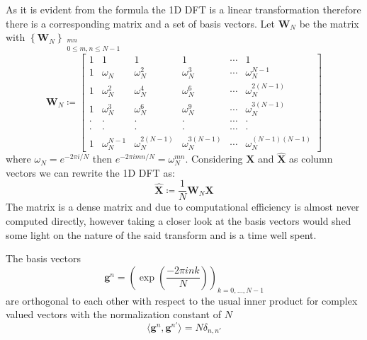 \begin{Rem}
As it is evident from the formula the 1D \ac{DFT} is a linear transformation therefore there is a corresponding matrix 
and a set of basis vectors. Let $\boldsymbol{W}_N$ be the matrix with $\left\{\boldsymbol{W}_N\right\}_{\substack{mn \\ 0 \leq m,n \leq N-1}}$ 
\begin{equation}
    \boldsymbol{W}_N \coloneqq 
    \begin{bmatrix}
        1     & 1                & 1                   & 1                   & \cdots & 1                      \\
        1     & \omega_{N}^{}    & \omega_{N}^{2}      & \omega_{N}^{3}      & \cdots & \omega_{N}^{N-1}       \\
        1     & \omega_{N}^{2}   & \omega_{N}^{4}      & \omega_{N}^{6}      & \cdots & \omega_{N}^{2(N-1)}    \\
        1     & \omega_{N}^{3}   & \omega_{N}^{6}      & \omega_{N}^{9}      & \cdots & \omega_{N}^{3(N-1)}    \\
        \cdot & \cdot            & \cdot               & \cdot               & \cdots & \cdot                  \\ 
        \cdot & \cdot            & \cdot               & \cdot               & \cdots & \cdot                  \\ 
        1     & \omega_{N}^{N-1} & \omega_{N}^{2(N-1)} & \omega_{N}^{3(N-1)} & \cdots & \omega_{N}^{(N-1)(N-1)}
        \end{bmatrix}
\end{equation}
where $\omega_N = e^{-2\pi i/N}$ then $e^{-2\pi imn/N} = \omega_N^{mn}$. Considering $\boldsymbol{X}$ 
and $\hat {\boldsymbol{X}}$ as column vectors we can rewrite the 1D \ac{DFT} as:
\begin{equation}
    \hat {\boldsymbol{X}} \coloneqq \frac{1}{N}\boldsymbol{W}_N\boldsymbol{X}
\end{equation}
 The matrix is a dense matrix\cite{Frazier1999}\cite{Cormen2022} and due to computational 
efficiency\cite{Frazier1999}\cite{Cormen2022} is almost never computed directly, however taking a closer look at the 
basis vectors would shed some light on the nature of the said transform and is a time well spent.
\end{Rem}

\begin{Prop}\label{Prop:1ddftbasisvectors}
    The basis vectors
    \begin{equation}\label{eq:1ddftbasisvectors}
        \boldsymbol{g}^n = \left(\exp\left({\frac{-2\pi ink}{N}}\right)\right)_{k=0,\ldots,N-1}
    \end{equation}
    are orthogonal to each other with respect to the usual inner product for complex valued vectors 
    with the normalization constant of $N$
    \begin{equation}
        \langle\boldsymbol{g}^n,\boldsymbol{g}^{n'}\rangle= N \delta_{n,n'}
    \end{equation}
\end{Prop}

